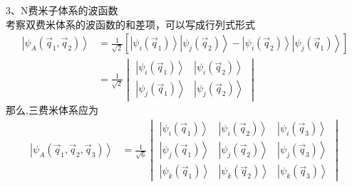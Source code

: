 \begin{frame}[label=current]
  \frametitle{}
  3、N费米子体系的波函数 \\
  考察双费米体系的波函数的和差项，可以写成行列式形式
  \[\begin{aligned}
    \left\vert \psi _A(\vec{q}_1,\vec{q}_2) \right\rangle  &= \frac{1}{\sqrt{2} }\left[\left\vert \psi _i(\vec{q}_1)\right\rangle \left\vert \psi _j(\vec{q}_2) \right\rangle  - \left\vert \psi _i(\vec{q}_2)\right\rangle \left\vert \psi _j(\vec{q}_1) \right\rangle\right] \\ 
    &= \frac{1}{\sqrt{2}} \begin{vmatrix}\left\vert \psi _i(\vec{q}_1)\right\rangle  &\left\vert \psi _i(\vec{q}_2)\right\rangle \\ 
    \left\vert \psi _j(\vec{q}_1) \right\rangle & \left\vert \psi _j(\vec{q}_2)\right\rangle 
  \end{vmatrix}  
  \end{aligned} \]
  那么,三费米体系应为 
  \[\begin{aligned}
    \left\vert \psi _A(\vec{q}_1,\vec{q}_2,\vec{q}_3) \right\rangle  
    &= \frac{1}{\sqrt{6}} \begin{vmatrix}\left\vert \psi _i(\vec{q}_1)\right\rangle  &\left\vert \psi _i(\vec{q}_2)\right\rangle &\left\vert \psi _i(\vec{q}_3)\right\rangle \\ 
    \left\vert \psi _j(\vec{q}_1) \right\rangle & \left\vert \psi _j(\vec{q}_2)\right\rangle & \left\vert \psi _j(\vec{q}_3)\right\rangle \\
    \left\vert \psi _k(\vec{q}_1) \right\rangle & \left\vert \psi _k(\vec{q}_2)\right\rangle & \left\vert \psi _k(\vec{q}_3)\right\rangle 
  \end{vmatrix}  
  \end{aligned} \]
\end{frame} 

